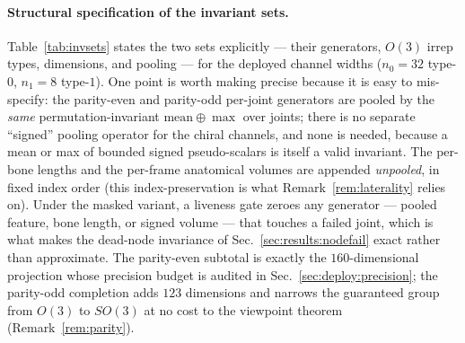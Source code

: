\paragraph{Structural specification of the invariant sets.} Table~\ref{tab:invsets} states the two
sets explicitly --- their generators, $O(3)$ irrep types, dimensions, and pooling --- for the
deployed channel widths ($n_0=32$ type-$0$, $n_1=8$ type-$1$). One point is worth making precise
because it is easy to mis-specify: the parity-even and parity-odd per-joint generators are pooled by
the \emph{same} permutation-invariant $\mathrm{mean}\oplus\max$ over joints; there is no separate
``signed'' pooling operator for the chiral channels, and none is needed, because a mean or max of
bounded signed pseudo-scalars is itself a valid invariant. The per-bone lengths and the per-frame
anatomical volumes are appended \emph{unpooled}, in fixed index order (this index-preservation is what
Remark~\ref{rem:laterality} relies on). Under the masked variant, a liveness gate zeroes any generator
--- pooled feature, bone length, or signed volume --- that touches a failed joint, which is what makes
the dead-node invariance of Sec.~\ref{sec:results:nodefail} exact rather than approximate. The
parity-even subtotal is exactly the $160$-dimensional projection whose precision budget is audited in
Sec.~\ref{sec:deploy:precision}; the parity-odd completion adds $123$ dimensions and narrows the
guaranteed group from $O(3)$ to $SO(3)$ at no cost to the viewpoint theorem
(Remark~\ref{rem:parity}).

